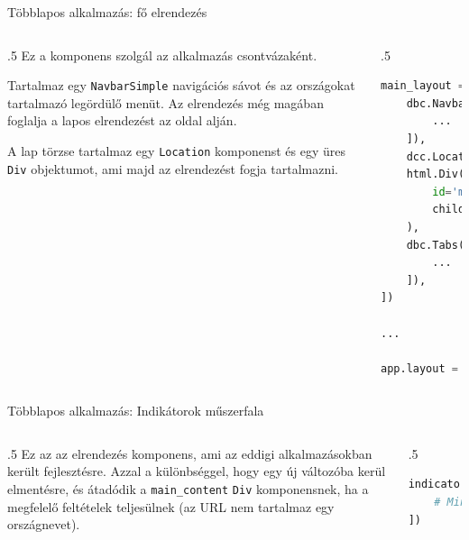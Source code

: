 \documentclass[english, aspectratio=169]{beamer}
\begin{document}
	\begin{frame}[fragile]{Többlapos alkalmazás: fő elrendezés}
		\begin{columns}
			\begin{column}{.5\textwidth}
				Ez a komponens szolgál az alkalmazás csontvázaként.\par\medskip
				Tartalmaz egy \texttt{NavbarSimple} navigációs sávot és az országokat tartalmazó legördülő menüt. Az elrendezés még magában foglalja a lapos elrendezést az oldal alján.\par\medskip
				A lap törzse tartalmaz egy \texttt{Location} komponenst és egy üres \texttt{Div} objektumot, ami majd az elrendezést fogja tartalmazni.
			\end{column}
			\begin{column}{.5\textwidth}
				\begin{lstlisting}[language=python]
main_layout = html.Div([
	dbc.NavbarSimple([
		...
	]),
	dcc.Location(id='location'),
	html.Div(
		id='main_content',
		children=[...],
	),
	dbc.Tabs([
		...
	]),
])

...

app.layout = main_layout
				\end{lstlisting}
			\end{column}
		\end{columns}
	\end{frame}
	
	\begin{frame}[fragile]{Többlapos alkalmazás: Indikátorok műszerfala}
		\begin{columns}
			\begin{column}{.5\textwidth}
				Ez az az elrendezés komponens, ami az eddigi alkalmazásokban került fejlesztésre. Azzal a különbséggel, hogy egy új változóba kerül elmentésre, és átadódik a \texttt{main\_content} \texttt{Div} komponensnek, ha a megfelelő feltételek teljesülnek (az URL nem tartalmaz egy országnevet).
			\end{column}
			\begin{column}{.5\textwidth}
				\begin{lstlisting}[language=python]
indicators_dashboard = html.Div([
	# Minden eddigi komponens
])
				\end{lstlisting}
			\end{column}
		\end{columns}
	\end{frame}
	
\end{document}
